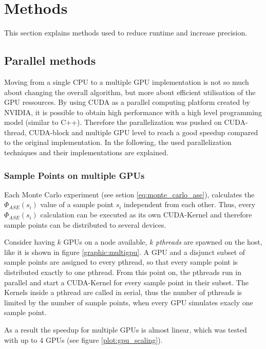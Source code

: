 \section{Methods}
This section explains methods used to reduce runtime and
increase precision.

\subsection{Parallel methods}
\label{subsec:parallel_methods}
Moving from a single CPU to a multiple
GPU implementation is not so much about changing the overall algorithm,
but more about efficient utilisation of the GPU ressources. 
By using CUDA as a parallel computing platform created by NVIDIA,
it is possible to obtain high performance with a high level 
programming model (similar to C++). Therefore the parallelization was pushed on CUDA-thread, 
CUDA-block and multiple GPU level to reach a good speedup compared to 
the original implementation.
In the following, the used parallelization
techniques and their implementations are explained.

\subsubsection{Sample Points on multiple GPUs}

Each Monte Carlo experiment (see setion \ref{eq:monte_carlo_ase}), calculates the $\Phi_{ASE}(s_i)$ 
value of a sample point $s_i$ independent from each other.
Thus, every $\Phi_{ASE}(s_i)$ calculation can be executed as its own CUDA-Kernel
and therefore sample points can be distributed to several devices.

Consider having $k$ GPUs on a node available, 
$k$ \emph{pthreads} are spawned on the host, like it
is shown in figure \ref{graphic:multigpu}. A GPU and a
disjunct subset of sample points are assigned to every pthread, so that every
sample point is distributed exactly to one pthread.
From this point on, the pthreads run in parallel and start a
CUDA-Kernel for every sample point in their subset.
The Kernels inside a pthread are called in serial,
thus the number of pthreads is limited by the number of sample points, when 
every GPU simulates exacly one sample point.

As a result the speedup for multiple
GPUs is almost linear, which was tested with up to 4 GPUs (see figure \ref{plot:gpu_scaling}).
    

